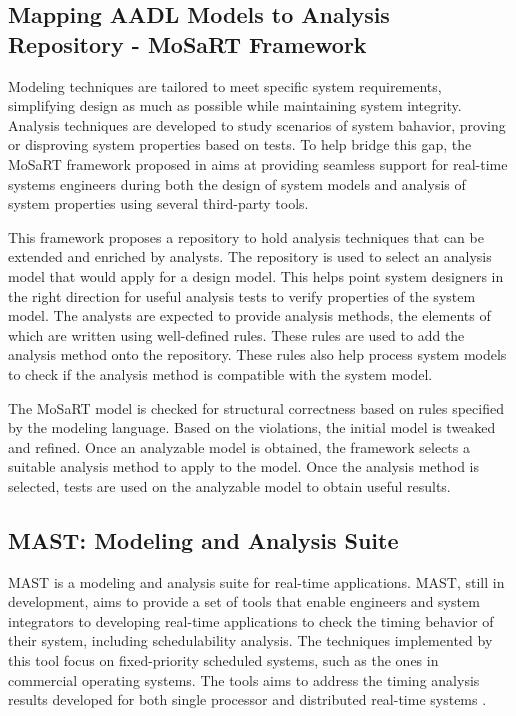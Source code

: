 \subsection{Mapping AADL Models to Analysis Repository - MoSaRT Framework}

Modeling techniques are tailored to meet specific system requirements, simplifying design as much as possible while maintaining system integrity. Analysis techniques are developed to study scenarios of system bahavior, proving or disproving system properties based on tests. To help bridge this gap, the MoSaRT framework proposed in \cite{Yassine2013} aims at providing seamless support for real-time systems engineers during both the design of system models and analysis of system properties using several third-party tools. 

This framework proposes a repository to hold analysis techniques that can be extended and enriched by analysts. The repository is used to select an analysis model that would apply for a design model. This helps point system designers in the right direction for useful analysis tests to verify properties of the system model. The analysts are expected to provide analysis methods, the elements of which are written using well-defined rules. These rules are used to add the analysis method onto the repository. These rules also help process system models to check if the analysis method is compatible with the system model.

The MoSaRT model is checked for structural correctness based on rules specified by the modeling language. Based on the violations, the initial model is tweaked and refined. Once an analyzable model is obtained, the framework selects a suitable analysis method to apply to the model. Once the analysis method is selected, tests are used on the analyzable model to obtain useful results.

\subsection{MAST: Modeling and Analysis Suite}

MAST \cite{934015} is a modeling and analysis suite for real-time applications. MAST, still in development, aims to provide a set of tools that enable engineers and system integrators to developing real-time applications to check the timing behavior of their system, including schedulability analysis. The techniques implemented by this tool focus on fixed-priority scheduled systems, such as the ones in commercial operating systems. The tools aims to address the timing analysis results developed for both single processor \cite{liu1973scheduling, klein2012practitioner} and distributed real-time systems \cite{palencia1999exploiting, tindell1994holistic}. 

